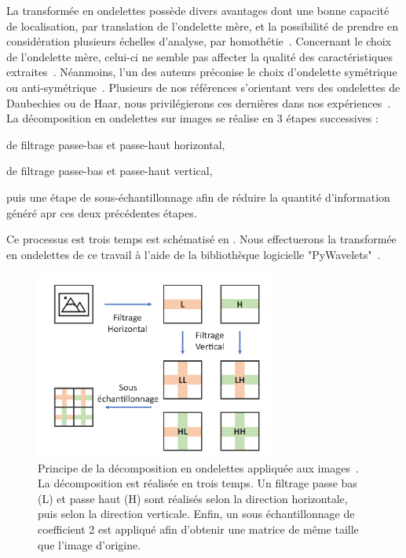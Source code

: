 La transformée en ondelettes possède divers avantages dont une bonne capacité de localisation, par translation de l'ondelette mère, et la possibilité de prendre en considération plusieurs échelles d'analyse, par homothétie~\cite{Livens1997,Wiltgen2008}. Concernant le choix de l'ondelette mère, celui-ci ne semble pas affecter la qualité des caractéristiques extraites~\cite{Fatemi1996, Livens1997}. Néanmoins, l'un des auteurs préconise le choix d'ondelette symétrique ou anti-symétrique~\cite{Livens1997}. Plusieurs de nos références s'orientant vers des ondelettes de Daubechies ou de Haar, nous privilégierons ces dernières dans nos expériences~\cite{Wiltgen2008,Halimi2017a}. La décomposition en ondelettes sur images se réalise en 3 étapes successives : 
\begin{inlinerate}
    \item de filtrage passe-bas et passe-haut horizontal,
    \item de filtrage passe-bas et passe-haut vertical,
    \item puis une étape de sous-échantillonnage afin de réduire la quantité d'information généré apr ces deux précédentes étapes.
\end{inlinerate} Ce processus est trois temps est schématisé en . Nous effectuerons la transformée en ondelettes de ce travail à l'aide de la bibliothèque logicielle "PyWavelets"~\cite{lee2006}.\par

\begin{figure}[H]
    \centering
    \includegraphics[width=0.7\textwidth]{contents/chapter_4/resources/scheme_dwt.pdf}
    \caption{Principe de la décomposition en ondelettes appliquée aux images~\cite{Livens1997}. La décomposition est réalisée en trois temps. Un filtrage passe bas (L) et passe haut (H) sont réalisés selon la direction horizontale, puis selon la direction verticale. Enfin, un sous échantillonnage de coefficient 2 est appliqué afin d'obtenir une matrice de même taille que l'image d'origine.}
    \label{fig:scheme_dwt}
\end{figure}\par 

